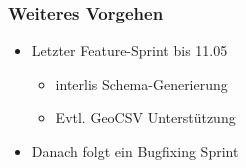 \documentclass[class=scrbook,crop=false]{standalone}
\begin{document}
	\subsubsection*{Weiteres Vorgehen}
	\begin{itemize}
		\item Letzter Feature-Sprint bis 11.05
		\begin{itemize}
			\item \gls{interlis} Schema-Generierung
			\item Evtl. GeoCSV Unterstützung
		\end{itemize}
		\item Danach folgt ein Bugfixing Sprint
	\end{itemize}
\end{document}
